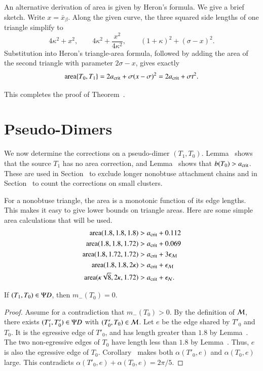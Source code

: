 An alternative derivation of area is given by Heron's formula. We give a brief sketch.
Write \(x=\bar x_\beta\). Along the given curve, the three squared side lengths of one triangle simplify to
\[
4\kappa^2+x^2,\qquad
4\kappa^2+\frac{x^2}{4\kappa^2},\qquad
(1+\kappa)^2+(\sigma-x)^2.
\]
Substitution into Heron's triangle-area formula,
followed by adding the area of the second triangle with parameter \(2\sigma-x\), gives exactly
\[
{\operatorname{area}}\{T_0,T_1\}
      =2a_{\rm crit}+\sigma(x-\sigma)^2
      =2a_{\rm crit}+\sigma t^2.
\]

This completes the proof of Theorem~.

\section{Pseudo-Dimers}

We now determine the corrections on a pseudo-dimer $(T_1,T_0)$.
Lemma~ shows that the source $T_1$ has no area correction,
and Lemma~ shows that $b(T_0)>a_\text{crit}$.  These are
used in Section~ to exclude longer nonobtuse
attachment chains and in Section~ to count the
corrections on small clusters.

For a nonobtuse triangle, the area is a monotonic function of its edge
lengths.  This makes it easy to give lower bounds on triangle areas.
Here are some simple area calculations that will be used.
\begin{align*}
{\operatorname{area}}(1.8,1.8,1.8) &> a_\text{crit} + 0.112\\
{\operatorname{area}}(1.8,1.8,1.72) &> a_\text{crit} + 0.069\\
{\operatorname{area}}(1.8,1.72,1.72) &> a_\text{crit} + 3\epsilon_{\mathcal M}\\
{\operatorname{area}}(1.8,1.8,2\kappa) &> a_\text{crit} + \epsilon_{\mathcal M}\\
{\operatorname{area}}(\kappa\sqrt8,2\kappa,1.72) &> a_\text{crit} +\epsilon_{\mathcal N}.
\end{align*}

\begin{lemma}  
If $(T_1,T_0)\in\Psi D$, then $m_-(T_0)=0$.
\end{lemma}

\begin{proof} 
  Assume for a contradiction that $m_-(T_0)>0$.  By the definition
  of $\mathcal M$, there exists $(T'_1,T'_0)\in\Psi D$ with
  $(T'_0,T_0)\in\mathcal M$.  Let $e$ be the edge shared by $T'_0$ and
  $T_0$.  It is the egressive edge of $T'_0$, and has length greater
  than $1.8$ by Lemma~.  The two non-egressive
  edges of $T_0$ have length less than $1.8$ by
  Lemma~.  Thus, $e$ is also the egressive edge
  of $T_0$.  Corollary~ makes both
  $\alpha(T'_0,e)$ and $\alpha(T_0,e)$ large.  This contradicts
  $\alpha(T'_0,e)+\alpha(T_0,e)=2\pi/5$.
\end{proof}

